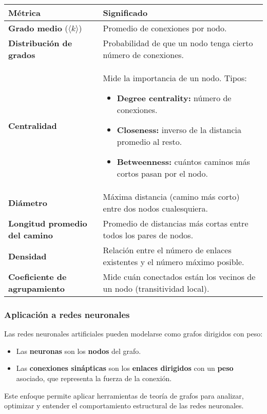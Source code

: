 \begin{center}
\begin{tabular}{@{}lp{10.5cm}@{}}
\toprule
\textbf{Métrica} & \textbf{Significado} \\
\midrule
\textbf{Grado medio} (\( \langle k \rangle \)) & Promedio de conexiones por nodo. \\
\textbf{Distribución de grados} & Probabilidad de que un nodo tenga cierto número de conexiones. \\
\textbf{Centralidad} & Mide la importancia de un nodo. Tipos: 
\begin{itemize}
    \item \textbf{Degree centrality:} número de conexiones.
    \item \textbf{Closeness:} inverso de la distancia promedio al resto.
    \item \textbf{Betweenness:} cuántos caminos más cortos pasan por el nodo.
\end{itemize} \\
\textbf{Diámetro} & Máxima distancia (camino más corto) entre dos nodos cualesquiera. \\
\textbf{Longitud promedio del camino} & Promedio de distancias más cortas entre todos los pares de nodos. \\
\textbf{Densidad} & Relación entre el número de enlaces existentes y el número máximo posible. \\
\textbf{Coeficiente de agrupamiento} & Mide cuán conectados están los vecinos de un nodo (transitividad local). \\
\bottomrule
\end{tabular}
\end{center}

\subsubsection{Aplicación a redes neuronales}

Las redes neuronales artificiales pueden modelarse como grafos dirigidos con peso:

\begin{itemize}
    \item Las \textbf{neuronas} son los \textbf{nodos} del grafo.
    \item Las \textbf{conexiones sinápticas} son los \textbf{enlaces dirigidos} con un \textbf{peso} asociado, que representa la fuerza de la conexión.
\end{itemize}

Este enfoque permite aplicar herramientas de teoría de grafos para analizar, optimizar y entender el comportamiento estructural de las redes neuronales.

